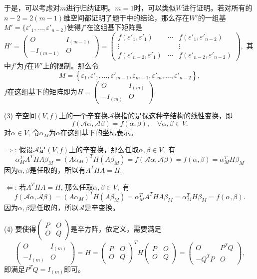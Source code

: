 于是，可以考虑对$m$进行归纳证明。$m = 1$时，可以类似$W$进行证明。若对所有的$n-2 = 2(m-1)$维空间都证明了题干中的结论，那么存在$W'$的一组基$M' = \{ \varepsilon'_1, \ldots, \varepsilon'_{n-2}  \}$使得$f'$在这组基下矩阵是$H' = \begin{pmatrix} O & I_{(m-1)} \\ -I_{(m-1)} & O \end{pmatrix} = \begin{pmatrix} f(\varepsilon'_1, \varepsilon'_1) & \cdots & f(\varepsilon'_1, \varepsilon'_{n-2}) \\ \vdots & & \vdots \\ f(\varepsilon'_{n-2}, \varepsilon'_1) & \cdots & f(\varepsilon'_{n-2}, \varepsilon'_{n-2}) \end{pmatrix},$ 其中$f'$为$f$在$W'$上的限制。那么令
$$M = \left\{ \varepsilon_1, \varepsilon'_1, \ldots, \varepsilon'_{m-1}, \varepsilon_{m+1}, \varepsilon'_m, \ldots, \varepsilon'_{n-2}  \right\},$$
$f$在这组基下的矩阵即为$H = \begin{pmatrix} O & I_{(m)} \\ -I_{(m)} & O \end{pmatrix}.$

(3) 辛空间$(V, f)$上的一个辛变换$\mathcal{A}$换指的是保这种辛结构的线性变换，即
$$f(\mathcal{A} \alpha, \mathcal{A} \beta) = f(\alpha, \beta), \quad \forall \alpha, \beta \in V.$$
对$\alpha \in V$, 令$\alpha_M$为$\alpha$在这组基下的坐标表示。

$\Longrightarrow$: 假设$\mathcal{A}$是$(V, f)$上的辛变换，那么任取$\alpha, \beta \in V,$ 有
$$
\alpha_M^T A^THA \beta_M = (A\alpha_M)^T H (A\beta_M) = f(\mathcal{A} \alpha, \mathcal{A} \beta) = f(\alpha, \beta) = \alpha_M^T H \beta_M
$$
因为$\alpha, \beta$是任取的，所以有$A^THA = H$.

$\Longleftarrow$: 若$A^THA = H$, 那么任取$\alpha, \beta \in V,$ 有
$$f(\mathcal{A} \alpha, \mathcal{A} \beta) = (A\alpha_M)^T H (A\beta_M) = \alpha_M^T A^THA \beta_M = \alpha_M^T H \beta_M = f(\alpha, \beta).$$
因为$\alpha, \beta$是任取的，所以$\mathcal{A}$是辛变换。

(4) 要使得$\begin{pmatrix} P & O \\ O & Q \end{pmatrix}$是辛方阵，依定义，需要满足
$$\begin{pmatrix} O & I_{(m)} \\ -I_{(m)} & O \end{pmatrix} = H = \begin{pmatrix} P & O \\ O & Q \end{pmatrix}^T H \begin{pmatrix} P & O \\ O & Q \end{pmatrix} = \begin{pmatrix} O & P^TQ \\ -Q^TP & O \end{pmatrix},$$
即满足$P^TQ = I_{(m)}$即可。

